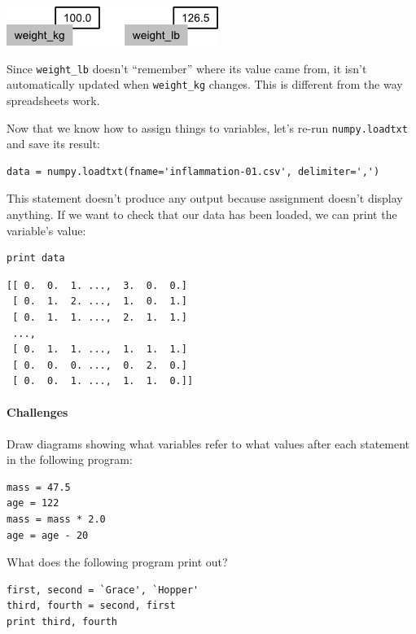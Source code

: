 \documentclass{book}
\begin{document}
\includegraphics{novice/python/img/python-sticky-note-variables-03.png}

Since \texttt{weight\_lb} doesn't ``remember'' where its value came
from, it isn't automatically updated when \texttt{weight\_kg} changes.
This is different from the way spreadsheets work.

Now that we know how to assign things to variables, let's re-run
\texttt{numpy.loadtxt} and save its result:

\begin{verbatim}
data = numpy.loadtxt(fname='inflammation-01.csv', delimiter=',')
\end{verbatim}

This statement doesn't produce any output because assignment doesn't
display anything. If we want to check that our data has been loaded, we
can print the variable's value:

\begin{verbatim}
print data
\end{verbatim}

\begin{verbatim}
[[ 0.  0.  1. ...,  3.  0.  0.]
 [ 0.  1.  2. ...,  1.  0.  1.]
 [ 0.  1.  1. ...,  2.  1.  1.]
 ...,
 [ 0.  1.  1. ...,  1.  1.  1.]
 [ 0.  0.  0. ...,  0.  2.  0.]
 [ 0.  0.  1. ...,  1.  1.  0.]]
\end{verbatim}

\mbox{}\paragraph{Challenges}

\begin{swcenumerate}
\item
  Draw diagrams showing what variables refer to what values after each
  statement in the following program:

\begin{verbatim}
mass = 47.5
age = 122
mass = mass * 2.0
age = age - 20
\end{verbatim}
\item
  What does the following program print out?
\begin{verbatim}
first, second = `Grace', `Hopper'
third, fourth = second, first
print third, fourth
\end{verbatim}
\end{swcenumerate}
\end{document}

